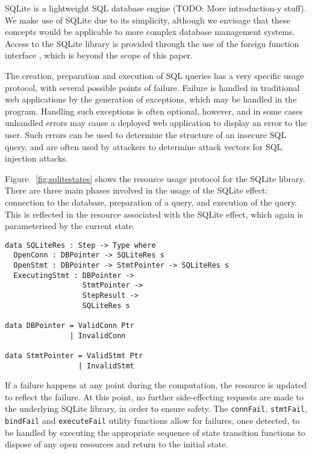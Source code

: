 \documentclass[preprint]{sigplanconf}
\begin{document}
SQLite is a lightweight SQL database engine \cite{sqlite} (TODO: More introduction-y stuff). We make use of SQLite due to its simplicity, although we envisage that these concepts would be applicable to more complex database management systems. Access to the SQLite library is provided through the use of the \idris{} foreign function interface \cite{ffi}, which is beyond the scope of this paper.

The creation, preparation and execution of SQL queries has a very specific usage protocol, with several possible points of failure. Failure is handled in traditional web applications by the generation of exceptions, which may be handled in the program.
Handling such exceptions is often optional, however, and in some cases unhandled errors may cause a deployed web application to display an error to the user. Such errors can be used to determine the structure of an insecure SQL query, and are often used by attackers to determine attack vectors for SQL injection attacks.

Figure ~\ref{fig:sqlitestates} shows the resource usage protocol for the SQLite library. There are three main phases involved in the usage of the SQLite effect: connection to the database, preparation of a query, and execution of the query. This is reflected in the resource associated with the SQLite effect, which again is parameterised by the current state.

\begin{verbatim}
data SQLiteRes : Step -> Type where
  OpenConn : DBPointer -> SQLiteRes s
  OpenStmt : DBPointer -> StmtPointer -> SQLiteRes s
  ExecutingStmt : DBPointer -> 
                  StmtPointer -> 
                  StepResult -> 
                  SQLiteRes s
                  
data DBPointer = ValidConn Ptr
               | InvalidConn

data StmtPointer = ValidStmt Ptr
                 | InvalidStmt 
\end{verbatim}
If a failure happens at any point during the computation, the resource is updated to reflect the failure. At this point, no further side-effecting requests are made to the underlying SQLite library, in order to ensure safety. The \texttt{connFail}, \texttt{stmtFail}, \texttt{bindFail} and \texttt{executeFail} utility functions allow for failures, once detected, to be handled by executing the appropriate sequence of state transition functions to dispose of any open resources and return to the initial state. 
\end{document}
